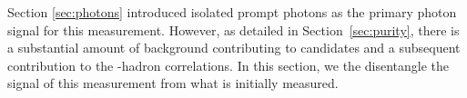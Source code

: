 Section \ref{sec:photons} introduced isolated prompt photons as the primary photon signal for this measurement. However, as detailed in Section~\ref{sec:purity}, there is a substantial amount of background contributing to \gammaiso candidates and a subsequent contribution to the \gammaiso-hadron correlations. In this section, we the disentangle the signal of this measurement from what is initially measured.\\ 

